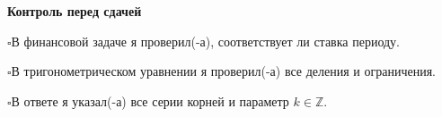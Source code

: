 \documentclass[a4paper,12pt]{article}
\newcommand{\checkitem}[1]{\par\noindent\hspace{-1pt}\textcolor{accent}{\(\square\)}\enspace #1\par}
\begin{document}
\vspace{11mm}
\textbf{Контроль перед сдачей}
\checkitem{В финансовой задаче я проверил(-а), соответствует ли ставка периоду.}
\checkitem{В тригонометрическом уравнении я проверил(-а) все деления и ограничения.}
\checkitem{В ответе я указал(-а) все серии корней и параметр \(k\in\mathbb Z\).}
\end{document}
